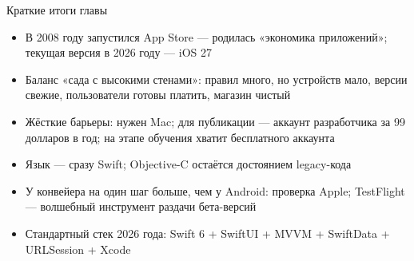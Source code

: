 \begin{tcbsummary}{Краткие итоги главы}
\begin{itemize}
  \item В 2008 году запустился App Store — родилась «экономика приложений»; текущая версия в 2026 году — iOS 27
  \item Баланс «сада с высокими стенами»: правил много, но устройств мало, версии свежие, пользователи готовы платить, магазин чистый
  \item Жёсткие барьеры: нужен Mac; для публикации — аккаунт разработчика за 99 долларов в год; на этапе обучения хватит бесплатного аккаунта
  \item Язык — сразу Swift; Objective-C остаётся достоянием legacy-кода
  \item У конвейера на один шаг больше, чем у Android: проверка Apple; TestFlight — волшебный инструмент раздачи бета-версий
  \item Стандартный стек 2026 года: Swift 6 + SwiftUI + MVVM + SwiftData + URLSession + Xcode
\end{itemize}

\end{tcbsummary}
